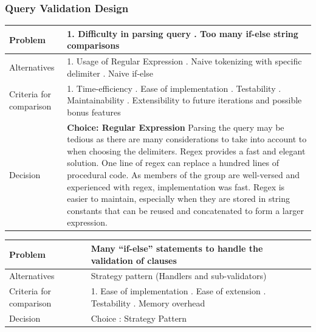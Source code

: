 \documentclass[12pt]{article}
\begin{document}
{{{{{{{{{{{{{\subsubsection{Query Validation Design}
\begin{tabular}{|L{5cm} | L{12cm}| }
\hline
Problem &
1. Difficulty in parsing query
. Too many if-else string comparisons
 \\
    \hline
    Alternatives &
1. Usage of Regular Expression
. Naive tokenizing with specific delimiter
. Naive if-else
 \\
\hline
    Criteria for comparison &
1. Time-efficiency
. Ease of implementation
. Testability
. Maintainability
. Extensibility to future iterations and possible bonus features\\
 \hline
   Decision & \textbf{Choice:  Regular Expression}
\newline
Parsing the query may be tedious as there are many considerations to take into account to when choosing the delimiters. Regex provides a fast and elegant solution. One line of regex can replace a hundred lines of procedural code. As members of  the group are well-versed and experienced with regex, implementation was fast. Regex is easier to maintain, especially when they are stored in string constants that can be reused and concatenated to form a larger expression.
 \\
 \hline
\end{tabular}
\newline
\begin{tabular}{|L{5cm} | L{12cm}| }
\hline
Problem &
Many “if-else” statements to handle the validation of clauses
 \\
    \hline
Alternatives &
Strategy pattern (Handlers and sub-validators)
 \\
\hline
Criteria for comparison & 
1. Ease of implementation . Ease of extension . Testability . Memory overhead
 \\
\hline
Decision &
Choice : Strategy Pattern \newline


\end{tabular}}}}}}}}}}}}}}
\end{document}
